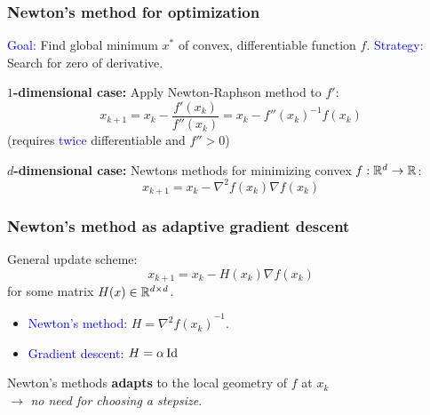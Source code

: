 \documentclass{beamer}
\begin{document}
\begin{frame}
  \frametitle{Newton's method for optimization}
  \textcolor{blue}{Goal:} Find global minimum $x^*$ of convex, differentiable function $f$.
  \textcolor{blue}{Strategy:} Search for zero of derivative.

  \textbf{$1$-dimensional case:} Apply Newton-Raphson method to $f'$:
  \begin{equation}
    x_{k+1} = x_k - \frac{f'(x_k)}{f''(x_k)} = x_k - {f''(x_k)}^{-1} f(x_k)
  \end{equation}
  (requires \textcolor{blue}{twice} differentiable and $f'' > 0$)

  \textbf{$d$-dimensional case:} Newtons methods for minimizing convex $f: \mathbb{R}^d \to \mathbb{R}$:
  \begin{equation}
    x_{k+1} = x_k - \nabla^2 f(x_k) \nabla f(x_k)
  \end{equation}

\end{frame}


\begin{frame}
  \frametitle{Newton's method as adaptive gradient descent}
  General update scheme:
  \begin{equation}
    x_{k+1} = x_k - H(x_k) \nabla f(x_k)
  \end{equation}
  for some matrix $H(x) \in \mathbb{R}^{d \times d}$.
  \begin{itemize}
    \item \textcolor{blue}{Newton's method}: $H = {\nabla^2 f(x_k)}^{-1}$.
    \item \textcolor{blue}{Gradient descent}: $H = \alpha \operatorname*{Id}$
  \end{itemize}
  \vspace{1cm}
  Newton's methods \textbf{adapts} to the local geometry of $f$ at $x_k$ \\
  $\rightarrow$ \textit{no need for choosing a stepsize}.
\end{frame}
\end{document}
